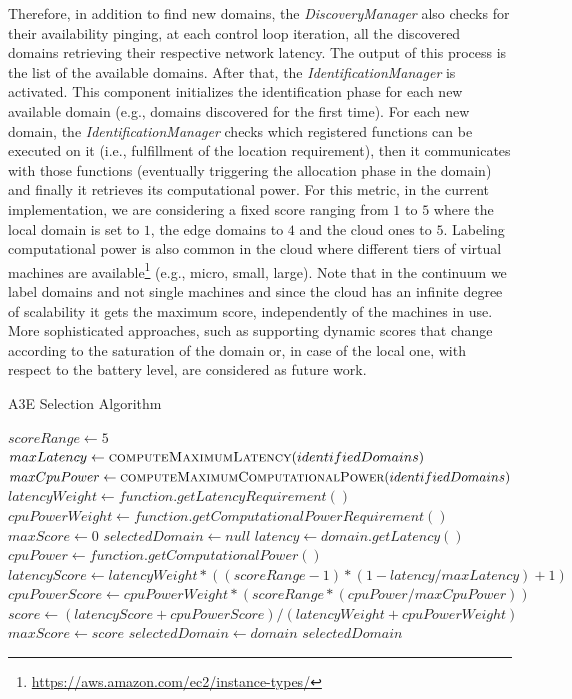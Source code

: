 Therefore, in addition to find new domains, the \textit{DiscoveryManager} also checks for their availability pinging, at each control loop iteration, all the discovered domains retrieving their respective network latency. The output of this process is the list of the available domains. After that, the \textit{IdentificationManager} is activated. This component initializes the identification phase for each new available domain (e.g., domains discovered for the first time). For each new domain, the \textit{IdentificationManager} checks which registered functions can be executed on it (i.e., fulfillment of the location requirement), then it communicates with those functions (eventually triggering the allocation phase in the domain) and finally it retrieves its computational power. For this metric, in the current implementation, we are considering a fixed score ranging from $1$ to $5$ where the local domain is set to $1$, the edge domains to $4$ and the cloud ones to $5$. Labeling computational power is also common in the cloud where different tiers of virtual machines are available\footnote{\url{https://aws.amazon.com/ec2/instance-types/}} (e.g., micro, small, large). Note that in the continuum we label domains and not single machines and since the cloud has an infinite degree of scalability it gets the maximum score, independently of the machines in use. More sophisticated approaches, such as supporting dynamic scores that change according to the saturation of the domain or, in case of the local one, with respect to the battery level, are considered as future work.  

\begin{algorithm}[b]
	\caption{A3E Selection Algorithm}
	\label{alg:selection}
	\begin{algorithmic}[1]
		
		\State$scoreRange \gets 5$
		\State $maxLatency \gets \Call{computeMaximumLatency}{identifiedDomains}$
		\State $maxCpuPower \gets \Call{computeMaximumComputationalPower}{identifiedDomains}$
		\State $latencyWeight \gets function.getLatencyRequirement()$ 
		\State $cpuPowerWeight \gets function.getComputationalPowerRequirement()$ 
		\State $maxScore \gets 0$
		\State $selectedDomain \gets null$
		\State $latency \gets domain.getLatency()$ 
		\State $cpuPower \gets function.getComputationalPower()$ 
		\State $latencyScore \gets latencyWeight*((scoreRange-1)*(1 - latency/maxLatency)+1)$ 
		\State $cpuPowerScore \gets cpuPowerWeight*(scoreRange*(cpuPower/maxCpuPower))$
		\State $score \gets (latencyScore + cpuPowerScore) / (latencyWeight + cpuPowerWeight)$
		\State $maxScore \gets score$
		\State $selectedDomain \gets domain$
		\EndIf
		\EndFor 
		\State \Return $selectedDomain$
		\EndFunction
	\end{algorithmic}
\end{algorithm}


